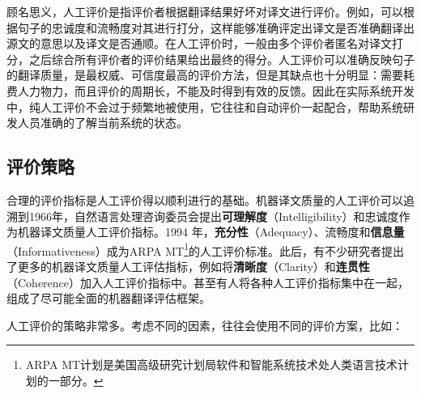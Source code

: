 \parinterval 顾名思义，人工评价是指评价者根据翻译结果好坏对译文进行评价。例如，可以根据句子的忠诚度和流畅度对其进行打分，这样能够准确评定出译文是否准确翻译出源文的意思以及译文是否通顺。在人工评价时，一般由多个评价者匿名对译文打分，之后综合所有评价者的评价结果给出最终的得分。人工评价可以准确反映句子的翻译质量，是最权威、可信度最高的评价方法，但是其缺点也十分明显：需要耗费人力物力，而且评价的周期长，不能及时得到有效的反馈。因此在实际系统开发中，纯人工评价不会过于频繁地被使用，它往往和自动评价一起配合，帮助系统研发人员准确的了解当前系统的状态。


\subsection{评价策略}

\parinterval 合理的评价指标是人工评价得以顺利进行的基础。机器译文质量的人工评价可以追溯到1966年，自然语言处理咨询委员会提出{\small\sffamily\bfseries{可理解度}}（Intelligibility）和忠诚度作为机器译文质量人工评价指标。1994 年，{\small\sffamily\bfseries{充分性}}（Adequacy）、流畅度和{\small\sffamily\bfseries{信息量}}（Informativeness）成为ARPA MT\footnote{ARPA MT计划是美国高级研究计划局软件和智能系统技术处人类语言技术计划的一部分。}的人工评价标准。此后，有不少研究者提出了更多的机器译文质量人工评估指标，例如将{\small\sffamily\bfseries{清晰度}}（Clarity）和{\small\sffamily\bfseries{连贯性}}（Coherence）加入人工评价指标中。甚至有人将各种人工评价指标集中在一起，组成了尽可能全面的机器翻译评估框架。

\parinterval 人工评价的策略非常多。考虑不同的因素，往往会使用不同的评价方案，比如：

